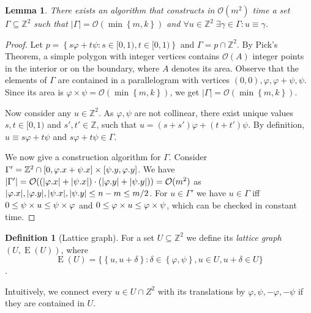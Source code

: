 \documentclass[11pt, letterpaper]{article}
\theoremstyle{plain}
\newtheorem{lemma}{Lemma}
\theoremstyle{definition}
\newtheorem{definition}{Definition}
\theoremstyle{remark}
\newcommand{\Z}{\mathbb{Z}}
\renewcommand{\O}{\mathcal{O}}
\renewcommand{\phi}{\varphi}
\newcommand{\set}[1]{\left\lbrace #1 \right\rbrace}
\newcommand{\bigset}[1]{\big \lbrace #1 \big \rbrace}
\DeclareMathOperator*{\Edges}{E}
\begin{document}
\begin{lemma} \label{lattice_base}
	There exists an algorithm that constructs in $\O(m^2)$ time a set $\Gamma \subseteq \Z^2$ such that $|\Gamma| = \O(\min\set{m, k})$ and $\forall u \in \Z^2 \; \exists \gamma \in \Gamma : u \equiv \gamma$.
\end{lemma} 
	\begin{proof}
		Let $p = \set{s\phi + t\psi : s \in [0, 1), t \in [0, 1)}$ and $\Gamma = p \cap \Z^2$.
		By Pick's Theorem, a simple polygon with integer vertices contains $\O(A)$ integer points in the interior or on the boundary, where $A$ denotes its area.
		Observe that the elements of $\Gamma$ are contained in a parallelogram with vertices $(0, 0), \phi, \phi + \psi, \psi$.
		Since its area is $\phi \times \psi = \O(\min\set{m, k})$, we get $|\Gamma| = \O(\min\set{m, k})$.
		
		Now consider any $u \in \Z^2$.
		As $\phi, \psi$ are not collinear, there exist unique values $s, t \in [0, 1)$ and $s', t' \in \Z$, such that
		$u = (s + s') \phi + (t + t') \psi$.
		By definition, 
		$u \equiv s\phi + t\psi$ and $s\phi + t\psi \in \Gamma$.
		
		We now give a construction algorithm for $\Gamma$. Consider $\Gamma' = \Z^2 \cap [0,\x{\phi}+\x{\psi}] \times [\y{\psi},\y{\phi}]$. We have $|\Gamma'| = \O((|\x{\phi}|+|\x{\psi}|) \cdot (|\y{\phi}|+|\y{\psi}|)) = \O(m^2)$ as $|\x{\phi}|, |\y{\phi}|, |\x{\psi}|, |\y{\psi}| \le n - m \le m / 2$. For $u \in \Gamma'$ we have $u \in \Gamma$ iff $0 \le \s{u} \le \s{\phi}$ and $0 \le \h{u} \le \h{\psi}$, which can be checked in constant time. 
	\end{proof}

\begin{definition}[Lattice graph]
	For a set $U \subseteq \Z^2$ we define its \emph{lattice graph} $(U, \Edges(U))$, where
	\[ \Edges(U) = \bigset{\set{u, u + \delta} : \delta \in \set{\phi, \psi}, u \in U, u + \delta \in U}\].
\end{definition}
Intuitively, we connect every $u \in U \cap Z^2$ with its translations by $\phi, \psi, -\phi, -\psi$ if they are contained in $U$.
\end{document}
